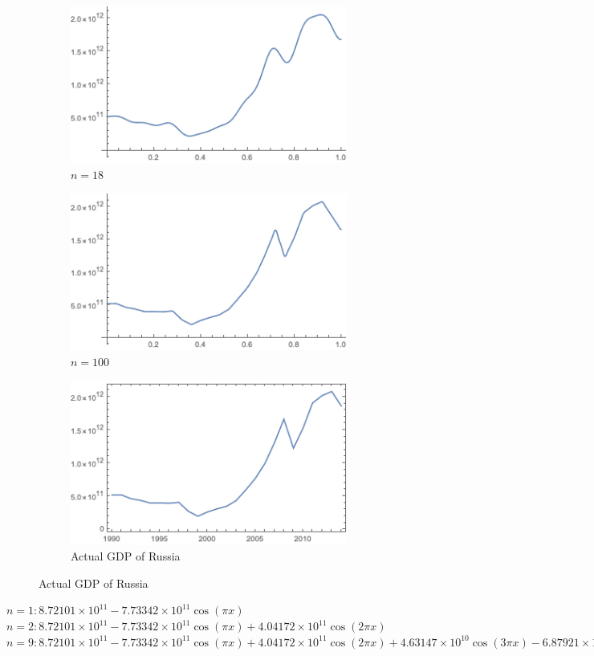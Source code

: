 \documentclass[12pt,letterpaper,reqno]{amsart}
\begin{document}
\begin{enumerate}[1.]
\begin{figure}[h]
\centering
\begin{subfigure}{.33\textwidth}
  \centering
  \includegraphics[width=.8\linewidth]{./RussiaGDPn18.png}
  \caption*{$n=18$}
\end{subfigure}%
\begin{subfigure}{.33\textwidth}
  \centering
  \includegraphics[width=.8\linewidth]{./RussiaGDPn100.png}
  \caption*{$n=100$}
\end{subfigure}
\begin{subfigure}{.33\textwidth}
  \centering
  \includegraphics[width=.8\linewidth]{./RussiaGDP.png}
  \caption*{Actual GDP of Russia}
\end{subfigure}
\end{figure}
\begin{flushleft}
$n=1: 8.72101\times 10^{11}-7.73342\times 10^{11} \cos (\pi  x)$\newline
$n=2: 8.72101\times 10^{11}-7.73342\times 10^{11} \cos (\pi  x)+4.04172\times 10^{11} \cos (2 \pi  x)$
$n=9: 8.72101\times 10^{11} -7.73342\times 10^{11} \cos (\pi  x)+4.04172\times 10^{11} \cos (2 \pi  x)+4.63147\times 10^{10} \cos (3 \pi  x)-6.87921\times 10^{10} \cos (4 \pi  x)+2.26595\times 10^9 \cos (5 \pi  x)+1.16897\times 10^{10} \cos (6 \pi  x)+2.63286\times 10^{10} \cos (7 \pi  x)-3.31438\times 10^{10} \cos (8 \pi  x)+8.62262\times 10^{10} \cos (9 \pi  x)$
\end{flushleft}
\end{enumerate}
\end{document}
